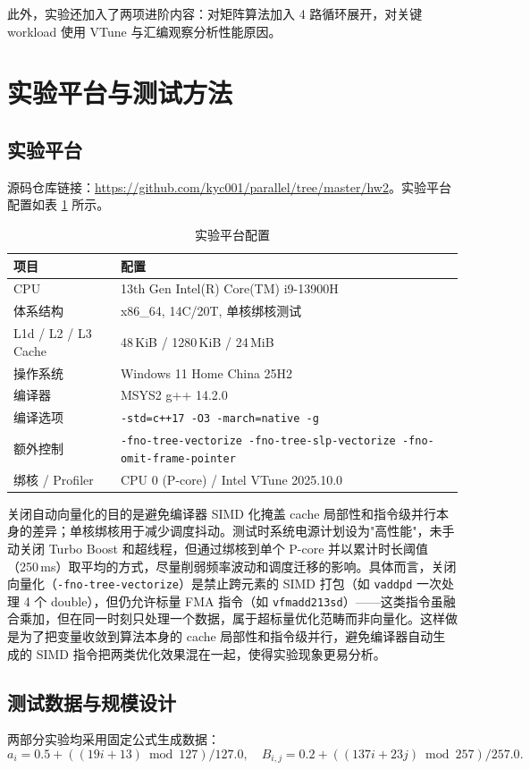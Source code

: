 \documentclass[a4paper,11pt,UTF8]{ctexart}
\begin{document}
此外，实验还加入了两项进阶内容：对矩阵算法加入 4 路循环展开，对关键 workload 使用 VTune 与汇编观察分析性能原因。

\section{实验平台与测试方法}
\subsection{实验平台}
源码仓库链接：\url{https://github.com/kyc001/parallel/tree/master/hw2}。实验平台配置如表 \ref{tab:env} 所示。

\begin{table}[H]
  \centering\small
  \begin{tabular}{ll}
    \toprule
    项目 & 配置 \\
    \midrule
    CPU & 13th Gen Intel(R) Core(TM) i9-13900H \\
    体系结构 & x86\_64, 14C/20T, 单核绑核测试 \\
    L1d / L2 / L3 Cache & 48\,KiB / 1280\,KiB / 24\,MiB \\
    操作系统 & Windows 11 Home China 25H2 \\
    编译器 & MSYS2 g++ 14.2.0 \\
    编译选项 & \texttt{-std=c++17 -O3 -march=native -g} \\
    额外控制 & \texttt{-fno-tree-vectorize -fno-tree-slp-vectorize -fno-omit-frame-pointer} \\
    绑核 / Profiler & CPU 0 (P-core) / Intel VTune 2025.10.0 \\
    \bottomrule
  \end{tabular}
  \caption{实验平台配置}
  \label{tab:env}
\end{table}

关闭自动向量化的目的是避免编译器 SIMD 化掩盖 cache 局部性和指令级并行本身的差异；单核绑核用于减少调度抖动。测试时系统电源计划设为"高性能"，未手动关闭 Turbo Boost 和超线程，但通过绑核到单个 P-core 并以累计时长阈值（250\,ms）取平均的方式，尽量削弱频率波动和调度迁移的影响。具体而言，关闭向量化（\texttt{-fno-tree-vectorize}）是禁止跨元素的 SIMD 打包（如 \texttt{vaddpd} 一次处理 4 个 double），但仍允许标量 FMA 指令（如 \texttt{vfmadd213sd}）——这类指令虽融合乘加，但在同一时刻只处理一个数据，属于超标量优化范畴而非向量化。这样做是为了把变量收敛到算法本身的 cache 局部性和指令级并行，避免编译器自动生成的 SIMD 指令把两类优化效果混在一起，使得实验现象更易分析。

\subsection{测试数据与规模设计}
两部分实验均采用固定公式生成数据：
\[
  a_i = 0.5 + ((19i + 13) \bmod 127) / 127.0 ,\quad
  B_{i,j} = 0.2 + ((137i + 23j) \bmod 257) / 257.0 .
\]
\end{document}

